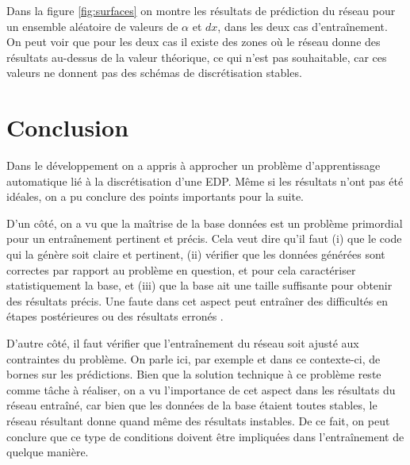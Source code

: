 \documentclass[a4paper,12pt,french]{article}
\begin{document}
Dans la figure \ref{fig:surfaces} on montre les résultats de prédiction du réseau pour un ensemble aléatoire de valeurs de $\alpha$ et $dx$, dans les deux cas d'entraînement. On peut voir que pour les deux cas il existe des zones où le réseau donne des résultats au-dessus de la valeur théorique, ce qui n'est pas souhaitable, car ces valeurs ne donnent pas des schémas de discrétisation stables. 


\section{Conclusion}

Dans le développement on a appris à approcher un problème d'apprentissage automatique lié à la discrétisation d'une EDP. Même si les résultats n'ont pas été idéales, on a pu conclure des points importants pour la suite.

D'un côté, on a vu que la maîtrise de la base données est un problème primordial pour un entraînement pertinent et précis. Cela veut dire qu'il faut (i) que le code qui la génère soit claire et pertinent, (ii) vérifier que les données générées sont correctes par rapport au problème en question, et pour cela caractériser statistiquement la base, et (iii) que la base ait une taille suffisante pour obtenir des résultats précis. Une faute dans cet aspect peut entraîner des difficultés en étapes postérieures ou des résultats erronés .

D'autre côté, il faut vérifier que l'entraînement du réseau soit ajusté aux contraintes du problème. On parle ici, par exemple et dans ce contexte-ci, de bornes sur les prédictions. Bien que la solution technique à ce problème reste comme tâche à réaliser, on a vu l'importance de cet aspect dans les résultats du réseau entraîné, car bien que les données de la base étaient toutes stables, le réseau résultant donne quand même des résultats instables. De ce fait, on peut conclure que ce type de conditions doivent être impliquées dans l'entraînement de quelque manière.
   

%
%



\end{document}
